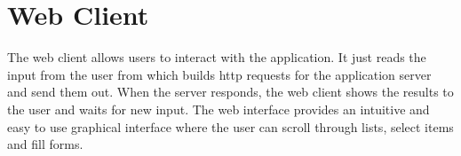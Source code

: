 \section{Web Client}\label{sec:archweb}

The web client allows users to interact with the application. It just reads the
input from the user from which builds http requests for the application server
and send them out. When the server responds, the web client shows the results to
the user and waits for new input. The web interface provides an intuitive and
easy to use graphical interface where the user can scroll through lists, select
items and fill forms.
